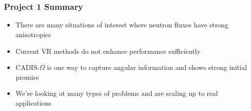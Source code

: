 \documentclass[xcolor=x11names,compress]{beamer}
\renewcommand{\(}{\begin{columns}}
\renewcommand{\)}{\end{columns}}
\newcommand{\<}[1]{\begin{column}{#1}}
\renewcommand{\>}{\end{column}}
\begin{document}
\section*{}
\begin{frame}[fragile]
  \frametitle{Project 1 Summary}
  \begin{itemize}
  \item There are many situations of interest where neutron fluxes have strong anisotropies
  \item Current VR methods do not enhance performance sufficiently 
  \pause
  \item CADIS-$\Omega$ is one way to capture angular information and shows strong initial promise
  \pause
  \item We're looking at many types of problems and are scaling up to real applications
  \end{itemize}
\end{frame}



\end{document}
